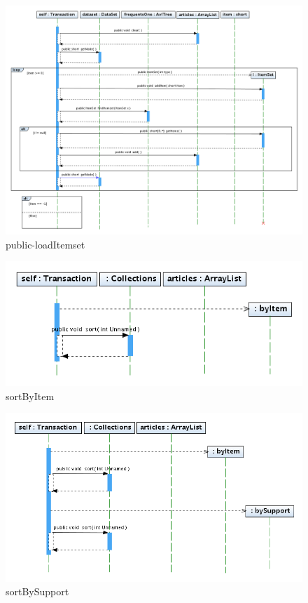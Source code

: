 \begin{figure}
\centering
\includegraphics[angle=90, width=1.3\textwidth]{Transaction/loadItemsets.png}
\caption{public-loadItemset}
\end{figure}
\newpage

\begin{figure}
\centering
\includegraphics[width=1\textwidth]{Transaction/sortByItem.png}
\caption{sortByItem}
\end{figure}
\newpage

\begin{figure}
\centering
\includegraphics[width=1\textwidth]{Transaction/sortBySupport.png}
\caption{sortBySupport}
\end{figure}
\newpage

